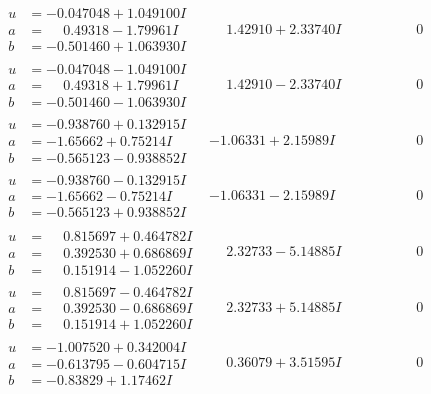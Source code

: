 \documentclass[1p]{elsarticle_modified}
\theoremstyle{definition}
\begin{document}
$$\begin{array}{c|c|c}
\begin{aligned}
u &= -0.047048 + 1.049100 I \\
a &= \phantom{-}0.49318 - 1.79961 I \\
b &= -0.501460 + 1.063930 I\end{aligned}
 & \phantom{-}1.42910 + 2.33740 I & \phantom{-0.000000 } 0 \\ \hline\begin{aligned}
u &= -0.047048 - 1.049100 I \\
a &= \phantom{-}0.49318 + 1.79961 I \\
b &= -0.501460 - 1.063930 I\end{aligned}
 & \phantom{-}1.42910 - 2.33740 I & \phantom{-0.000000 } 0 \\ \hline\begin{aligned}
u &= -0.938760 + 0.132915 I \\
a &= -1.65662 + 0.75214 I \\
b &= -0.565123 - 0.938852 I\end{aligned}
 & -1.06331 + 2.15989 I & \phantom{-0.000000 } 0 \\ \hline\begin{aligned}
u &= -0.938760 - 0.132915 I \\
a &= -1.65662 - 0.75214 I \\
b &= -0.565123 + 0.938852 I\end{aligned}
 & -1.06331 - 2.15989 I & \phantom{-0.000000 } 0 \\ \hline\begin{aligned}
u &= \phantom{-}0.815697 + 0.464782 I \\
a &= \phantom{-}0.392530 + 0.686869 I \\
b &= \phantom{-}0.151914 - 1.052260 I\end{aligned}
 & \phantom{-}2.32733 - 5.14885 I & \phantom{-0.000000 } 0 \\ \hline\begin{aligned}
u &= \phantom{-}0.815697 - 0.464782 I \\
a &= \phantom{-}0.392530 - 0.686869 I \\
b &= \phantom{-}0.151914 + 1.052260 I\end{aligned}
 & \phantom{-}2.32733 + 5.14885 I & \phantom{-0.000000 } 0 \\ \hline\begin{aligned}
u &= -1.007520 + 0.342004 I \\
a &= -0.613795 - 0.604715 I \\
b &= -0.83829 + 1.17462 I\end{aligned}
 & \phantom{-}0.36079 + 3.51595 I & \phantom{-0.000000 } 0 \\ \hline\begin{aligned}

\end{aligned}
\end{array}$$
\end{document}
